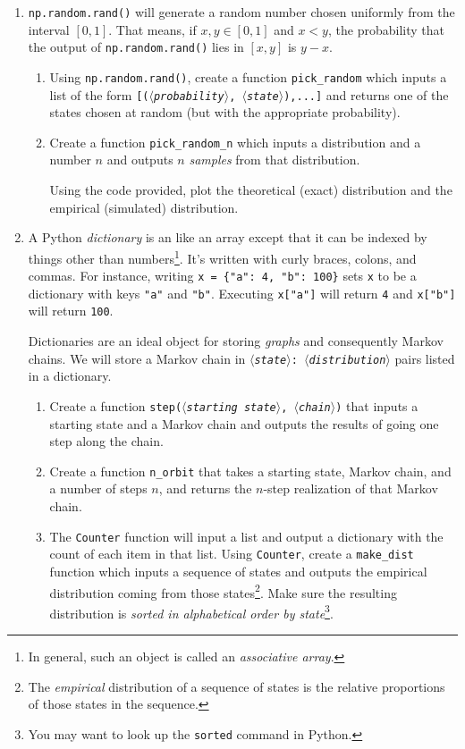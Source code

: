 \documentclass[letter]{article}
\newcommand{\var}[1]{{$\langle$\it #1$\rangle$}}
\begin{document}
	\begin{enumerate}
		\item {\tt np.random.rand()} will generate a random number chosen uniformly from the interval $[0,1]$. That
			means, if $x,y\in [0,1]$ and $x<y$, the probability that the output of {\tt np.random.rand()} lies in $[x,y]$
			is $y-x$.

		\begin{enumerate}
			\item 
			Using {\tt np.random.rand()}, create a function \verb|pick_random| which inputs a list of the form
			{\tt [(\var{probability}, \var{state}),...]} and returns one of the states chosen at random (but with 
			the appropriate probability).
			\item Create a function \verb|pick_random_n| which inputs a distribution and a number $n$ and outputs $n$
				\emph{samples} from that distribution.
				
				Using the code provided, plot the theoretical (exact) distribution and the empirical (simulated)
				distribution.
		\end{enumerate}

		\item A Python \emph{dictionary} is an like an array except that it can be indexed by things other than numbers\footnote{
		In general, such an object is called an \emph{associative array}.}. It's written with curly braces, colons, and commas.
		For instance, writing \verb|x = {"a": 4, "b": 100}| sets {\tt x} to be a dictionary with keys {\tt "a"} and {\tt "b"}.
		Executing \verb|x["a"]| will return {\tt 4} and \verb|x["b"]| will return {\tt 100}.

		Dictionaries are an ideal object for storing \emph{graphs} and consequently Markov chains. We will store a Markov chain
		in {\tt \var{state}: \var{distribution}} pairs listed in a dictionary.
		\begin{enumerate}
			\item Create a function {\tt step(\var{starting state}, \var{chain})} that inputs a starting state and a Markov chain
				and outputs the results of going one step along the chain.
			\item Create a function \verb|n_orbit| that takes a starting state, Markov chain, and a number of steps $n$, and
				returns the $n$-step realization of that Markov chain.
			\item The {\tt Counter} function will input a list and output a dictionary with the count of each item in that list.
				Using {\tt Counter}, create a \verb|make_dist| function which inputs a sequence of states and outputs
				the empirical distribution coming from those states\footnote{ The \emph{empirical} distribution
				of a sequence of states is the relative proportions of those states in the sequence.}. Make sure
				the resulting distribution is \emph{sorted in alphabetical order by state}\footnote{ You may want to look
				up the {\tt sorted} command in Python.}.


\end{enumerate}
\end{enumerate}
\end{document}
